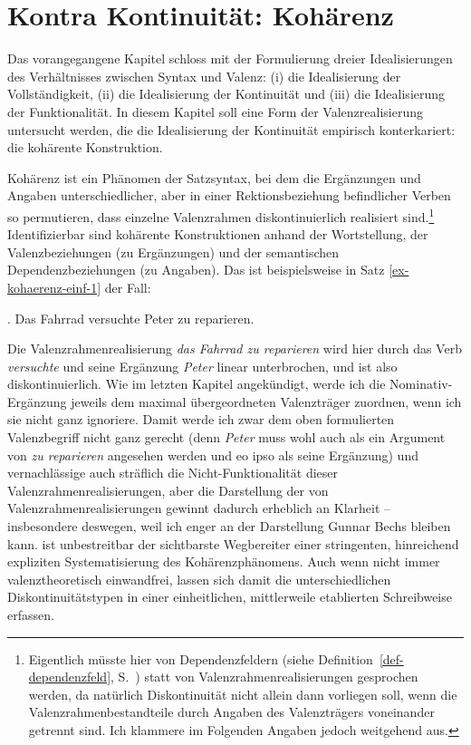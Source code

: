 \chapter{Kontra Kontinuität: Kohärenz} \label{chap-kohaerenz}

Das vorangegangene Kapitel schloss mit der Formulierung dreier Idealisierungen des Verhältnisses zwischen Syntax und Valenz: (i) die Idealisierung der Vollständigkeit, (ii) die Idealisierung der Kontinuität und (iii) die Idealisierung der Funktionalität. In diesem Kapitel soll eine Form der Valenzrealisierung untersucht werden, die die Idealisierung der Kontinuität empirisch konterkariert: die kohärente Konstruktion.

Kohärenz ist ein Phänomen der Satzsyntax, bei dem die Ergänzungen und Angaben  unterschiedlicher, aber in einer Rektionsbeziehung befindlicher Verben so permutieren, dass einzelne Valenzrahmen diskontinuierlich realisiert sind.\footnote{Eigentlich müsste hier von Dependenzfeldern (siehe Definition~\ref{def-dependenzfeld}, S.~\pageref{def-dependenzfeld}) statt von Valenzrahmenrealisierungen gesprochen werden, da natürlich Diskontinuität nicht allein dann vorliegen soll, wenn die Valenzrahmenbestandteile durch Angaben des Valenzträgers voneinander getrennt sind. Ich klammere im Folgenden Angaben jedoch weitgehend aus.} Identifizierbar sind kohärente Konstruktionen anhand der Wortstellung, der Valenzbeziehungen (zu Ergänzungen) und der semantischen Dependenzbeziehungen (zu Angaben). Das ist beispielsweise in Satz \ref{ex-kohaerenz-einf-1} der Fall:

\ex. \label{ex-kohaerenz-einf-1} Das Fahrrad versuchte Peter zu reparieren.

Die Valenzrahmenrealisierung  {\it das Fahrrad zu reparieren} wird hier durch das Verb {\it versuchte} und seine Ergänzung {\it Peter} linear unterbrochen, und ist also diskontinuierlich. Wie im letzten Kapitel angekündigt, werde ich die Nominativ-Ergänzung jeweils dem maximal übergeordneten Valenzträger zuordnen, wenn ich sie nicht ganz ignoriere. Damit werde ich zwar dem oben formulierten Valenzbegriff nicht ganz gerecht (denn {\it Peter} muss wohl auch als ein Argument von {\it zu reparieren} angesehen werden und eo ipso als seine Ergänzung) und vernachlässige auch sträflich die Nicht-Funktionalität dieser Valenzrahmenrealisierungen, aber die Darstellung der  von Valenzrahmenrealisierungen gewinnt dadurch erheblich an Klarheit -- insbesondere deswegen, weil ich enger an der Darstellung Gunnar Bechs bleiben kann. \cite{Bech:55} ist unbestreitbar der sichtbarste Wegbereiter einer stringenten, hinreichend expliziten Systematisierung des Kohärenzphänomens. Auch wenn nicht immer valenztheoretisch einwandfrei, lassen sich damit die unterschiedlichen Diskontinuitätstypen in einer einheitlichen, mittlerweile etablierten Schreibweise erfassen.

